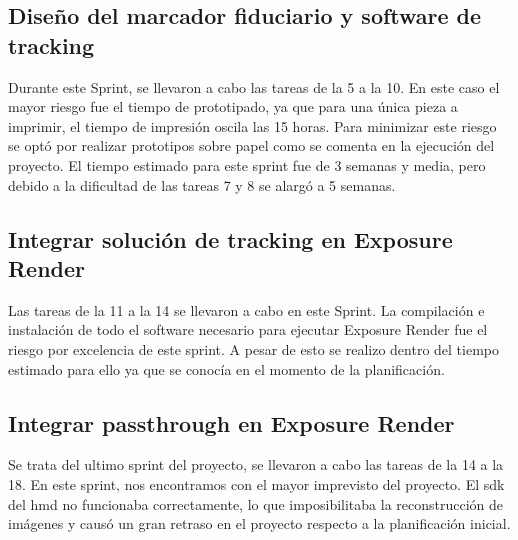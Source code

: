 \subsection{Diseño del marcador fiduciario y software de tracking}
Durante este Sprint, se llevaron a cabo las tareas de la 5 a la 10. En este caso el mayor riesgo fue el tiempo de prototipado, ya que para una única pieza a imprimir, el tiempo de impresión oscila las 15 horas. Para minimizar este riesgo se optó por realizar prototipos sobre papel como se comenta en la ejecución del proyecto. El tiempo estimado para este sprint fue de 3 semanas y media, pero debido a la dificultad de las tareas 7 y 8 se alargó a 5 semanas.

\subsection{Integrar solución de tracking en Exposure Render}
Las tareas de la 11 a la 14 se llevaron a cabo en este Sprint. La compilación e instalación de todo el software necesario para ejecutar Exposure Render fue el riesgo por excelencia de este sprint. A pesar de esto se realizo dentro del tiempo estimado para ello ya que se conocía en el momento de la planificación.

\subsection{Integrar passthrough en Exposure Render}
Se trata del ultimo sprint del proyecto, se llevaron a cabo las tareas de la 14 a la 18. En este sprint, nos encontramos con el mayor imprevisto del proyecto. El \acrshort{sdk} del \acrshort{hmd} no funcionaba correctamente, lo que imposibilitaba la reconstrucción de imágenes y causó un gran retraso en el proyecto respecto a la planificación inicial.